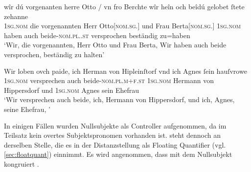 \begin{exe}
\ex \label{ex:cao_diffgend_11_beide}
	\begin{xlist}
	\ex \label{ex:cao_diffgend_11_beide_1}
		\gll wîr dú vorgenanten herre Otto / vn fro Berchte
				\textelp{} wîr heîn och beîdú \textelp{}
				gelobet ſtete zehanne \\
			\textsc{1sg\subMF.nom} die vorgenannten Herr Otto[\textsc{nom.sg.\MascM}] {}
				und Frau Berta[\textsc{nom.sg.\FemF}] {} \textsc{1sg\subMF.nom} haben
				auch beide-\textsc{nom.pl.\NeutMF.st} {} versprochen beständig
				zu=haben \\
		\trans `Wir, die vorgenannten, Herr Otto und Frau Berta,
		\textelp{} Wir haben auch beide \textelp{} versprochen, beständig zu
			halten'
			\parencites(Nr.~2931, Basel, 1298)[223,1--6]{cao4}

	\ex \label{ex:cao_diffgend_11_beide_2}
		\gll Wir loben ovch paide, ich Herman von
			Hipleinſtorf vnd ich Agnes ſein hauſvrowe \textelp{} \\
			\textsc{1sg\subMF.nom} versprechen auch beide-\textsc{nom.pl.m+f\subMF.st}
			\textsc{1sg\subM.nom} Hermann von Hippersdorf und \textsc{1sg\subF.nom}
			Agnes sein Ehefrau {} \\
		\trans `Wir versprechen auch beide, ich, Hermann von
			Hippersdorf, und ich, Agnes, seine Ehefrau, \textelp{}'
			\parencites(Nr.~N~701, Wien, 1295)[506,32--33]{cao5}
	\end{xlist}
\end{exe}

\label{phsec:vbctrl}
In einigen Fällen wurden Nullsubjekte als Controller aufgenommen, da im
Teilsatz kein overtes Subjektspronomen vorhanden ist.  steht
dennoch an derselben Stelle, die es in der Distanzstellung als Floating
Quantifier (vgl. \cref{sec:floatquant}) einnimmt. Es wird angenommen, dass
 mit dem Nullsubjekt kongruiert
\autocites[siehe auch][419]{dalrymple2001}[210]{bresnanetal2016}.

